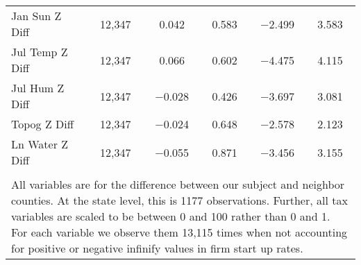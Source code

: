 \begin{table}[!htbp]
\begin{tabular}{@{\extracolsep{5pt}}lccccc}
Jan Sun Z Diff & 12,347 & 0.042 & 0.583 & $-$2.499 & 3.583 \\ 
Jul Temp Z Diff & 12,347 & 0.066 & 0.602 & $-$4.475 & 4.115 \\ 
Jul Hum Z Diff & 12,347 & $-$0.028 & 0.426 & $-$3.697 & 3.081 \\ 
Topog Z Diff & 12,347 & $-$0.024 & 0.648 & $-$2.578 & 2.123 \\ 
Ln Water Z Diff & 12,347 & $-$0.055 & 0.871 & $-$3.456 & 3.155 \\ 
\hline \\[-1.8ex] 
\multicolumn{6}{l}{All variables are for the difference between our subject and neighbor counties. At the state level, this is 1177 observations. Further, all tax variables are scaled to be between 0 and 100 rather than 0 and 1. For each variable we observe them 13,115 times when not accounting for positive or negative infinify values in firm start up rates.} \\ 
\end{tabular} 
\end{table} 
